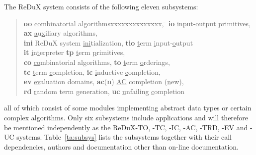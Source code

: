 The ReDuX system consists of the following eleven subsystems:
\begin{quote}
\begin{tabbing}
 {\bf oo} \underline{co}mbinatorial algorithmsxxxxxxxxxxxxxx, \= \kill
 {\bf io} \underline{i}nput-\underline{o}utput primitives, \>
 {\bf ax} \underline{a}u\underline{x}iliary algorithms, \\
 {\bf ini} ReDuX system \underline{ini}tialization, \>
 {\bf tio} \underline{t}erm \underline{i}nput-\underline{o}utput \\
 {\bf it} \underline{i}n\underline{t}erpreter \>
 {\bf tp} \underline{t}erm \underline{p}rimitives, \\
 {\bf co} \underline{co}mbinatorial algorithms, \>
 {\bf to} \underline{t}erm \underline{o}rderings, \\
 {\bf tc} \underline{t}erm \underline{c}ompletion, \>
 {\bf ic} \underline{i}nductive \underline{c}ompletion, \\
 {\bf ev} \underline{ev}aluation domains, \>
 {\bf ac}({\bf n}) \underline{AC} completion (\underline{n}ew), \\
 {\bf rd} \underline{r}andom term generation, \>
 {\bf uc} \underline{u}nfailing \underline{c}ompletion \\
\end{tabbing}
\end{quote}
all of which consist of some modules implementing abstract data types or
certain complex algorithms.
Only six subsystems include applications and will therefore be 
mentioned independently as the ReDuX-TO, -TC, -IC, -AC, -TRD, -EV and
-UC systems.
Table~\ref{ta:subsys} lists the subsystems together with their call 
dependencies, authors and documentation other than on-line documentation.
